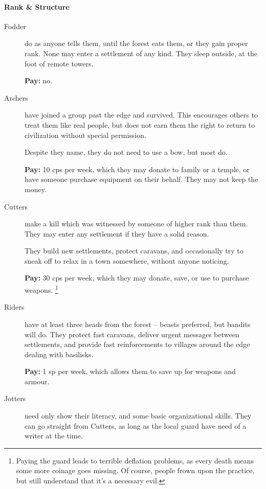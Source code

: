 \begin{multicols}{2}
\paragraph{Rank \& Structure}

\begin{description}
  \item[Fodder]
  \label{fodder}%
  do as anyone tells them, until the forest eats them, or they gain proper rank.
  None may enter a settlement of any kind.
  They sleep outside, at the foot of remote towers.

  \textbf{Pay:} no.

  \item[Archers]
  have joined a group past the \gls{edge} and survived.
  This encourages others to treat them like real people, but does not earn them the right to return to civilization without special permission.

  Despite they name, they do not need to use a bow, but most do.

  \textbf{Pay:} 10 \glspl{cp} per week, which they may donate to family or a temple, or have someone purchase equipment on their behalf.
  They may not keep the money.

  \item[Cutters]
  make a kill which was witnessed by someone of higher rank than them.
  They may enter any settlement if they have a solid reason.

  They build new settlements, protect caravans, and occasionally try to sneak off to relax in a town somewhere, without anyone noticing.

  \textbf{Pay:} 30 \glspl{cp} per week, which they may donate, save, or use to purchase weapons.%
  \footnote{Paying the \gls{guard} leads to terrible deflation problems, as every death means some more coinage goes missing.
  Of course, people frown upon the practice, but still understand that it's a necessary evil.}

  \item[Riders]
  have at least three heads from the forest -- beasts preferred, but bandits will do.
  They protect fast caravans, deliver urgent messages between settlements, and provide fast reinforcements to villages around the \gls{edge} dealing with basilisks.

  \textbf{Pay:} 1 \gls{sp} per week, which allows them to save up for weapons and armour.

  \item[Jotters]
  need only show their literacy, and some basic organizational skills.
  They can go straight from Cutters, as long as the local \gls{guard} have need of a writer at the time.


\end{description}
\end{multicols}
